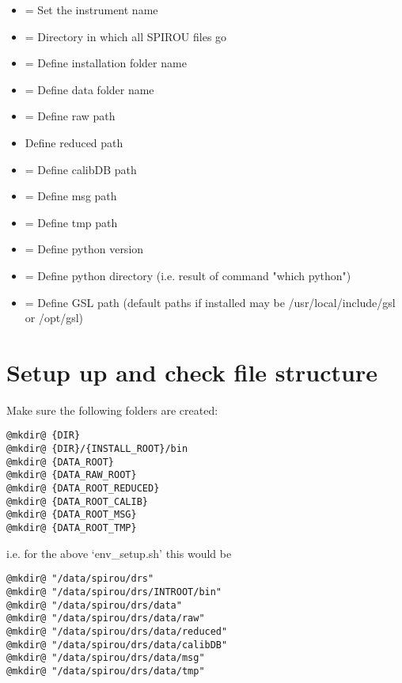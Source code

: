 \begin{itemize}
\item {} = Set the instrument name
\item {}= Directory in which all SPIROU files go
\item {} = Define installation folder name
\item {} = Define data folder name
\item {} = Define raw path
\item {} Define reduced path
\item {} = Define calibDB path
\item {} = Define msg path
\item {} = Define tmp path
\item {} = Define python version
\item {} = Define python directory (i.e. result of command "which python")
\item {} = Define GSL path (default paths if installed may be /usr/local/include/gsl or /opt/gsl)
\end{itemize}

\section{Setup up and check file structure}
\label{section:folder_setup}

Make sure the following folders are created:

\begin{lstlisting}[style=bashstyle]
@mkdir@ {DIR}
@mkdir@ {DIR}/{INSTALL_ROOT}/bin
@mkdir@ {DATA_ROOT}
@mkdir@ {DATA_RAW_ROOT}
@mkdir@ {DATA_ROOT_REDUCED}
@mkdir@ {DATA_ROOT_CALIB}
@mkdir@ {DATA_ROOT_MSG}
@mkdir@ {DATA_ROOT_TMP}
\end{lstlisting}

\noindent i.e. for the above `env\_setup.sh' this would be

\begin{lstlisting}[style=bashstyle]
@mkdir@ "/data/spirou/drs"
@mkdir@ "/data/spirou/drs/INTROOT/bin"
@mkdir@ "/data/spirou/drs/data"
@mkdir@ "/data/spirou/drs/data/raw"
@mkdir@ "/data/spirou/drs/data/reduced"
@mkdir@ "/data/spirou/drs/data/calibDB"
@mkdir@ "/data/spirou/drs/data/msg"
@mkdir@ "/data/spirou/drs/data/tmp"
\end{lstlisting}

